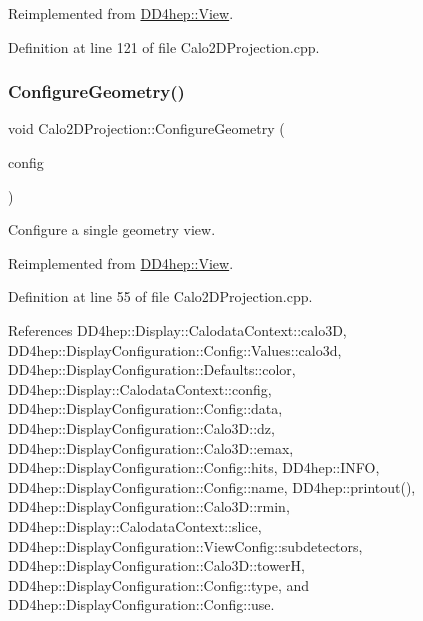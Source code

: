 Reimplemented from \hyperlink{class_d_d4hep_1_1_view_a655dc004a93ab9caa56ee5a501bf492f}{D\+D4hep\+::\+View}.



Definition at line 121 of file Calo2\+D\+Projection.\+cpp.

\hypertarget{class_d_d4hep_1_1_calo2_d_projection_aabf1a03b64b1baad596aaa9349e3cbea}{}\label{class_d_d4hep_1_1_calo2_d_projection_aabf1a03b64b1baad596aaa9349e3cbea} 
\subsubsection{\texorpdfstring{Configure\+Geometry()}{ConfigureGeometry()}}
{\footnotesize\ttfamily void Calo2\+D\+Projection\+::\+Configure\+Geometry (\begin{DoxyParamCaption}\item[{const \hyperlink{class_d_d4hep_1_1_display_configuration_1_1_view_config}{Display\+Configuration\+::\+View\+Config} \&}]{config }\end{DoxyParamCaption})\hspace{0.3cm}{\ttfamily [virtual]}}



Configure a single geometry view. 



Reimplemented from \hyperlink{class_d_d4hep_1_1_view_adefb4cb817819ec62803d34b89bf0988}{D\+D4hep\+::\+View}.



Definition at line 55 of file Calo2\+D\+Projection.\+cpp.



References D\+D4hep\+::\+Display\+::\+Calodata\+Context\+::calo3D, D\+D4hep\+::\+Display\+Configuration\+::\+Config\+::\+Values\+::calo3d, D\+D4hep\+::\+Display\+Configuration\+::\+Defaults\+::color, D\+D4hep\+::\+Display\+::\+Calodata\+Context\+::config, D\+D4hep\+::\+Display\+Configuration\+::\+Config\+::data, D\+D4hep\+::\+Display\+Configuration\+::\+Calo3\+D\+::dz, D\+D4hep\+::\+Display\+Configuration\+::\+Calo3\+D\+::emax, D\+D4hep\+::\+Display\+Configuration\+::\+Config\+::hits, D\+D4hep\+::\+I\+N\+FO, D\+D4hep\+::\+Display\+Configuration\+::\+Config\+::name, D\+D4hep\+::printout(), D\+D4hep\+::\+Display\+Configuration\+::\+Calo3\+D\+::rmin, D\+D4hep\+::\+Display\+::\+Calodata\+Context\+::slice, D\+D4hep\+::\+Display\+Configuration\+::\+View\+Config\+::subdetectors, D\+D4hep\+::\+Display\+Configuration\+::\+Calo3\+D\+::towerH, D\+D4hep\+::\+Display\+Configuration\+::\+Config\+::type, and D\+D4hep\+::\+Display\+Configuration\+::\+Config\+::use.

